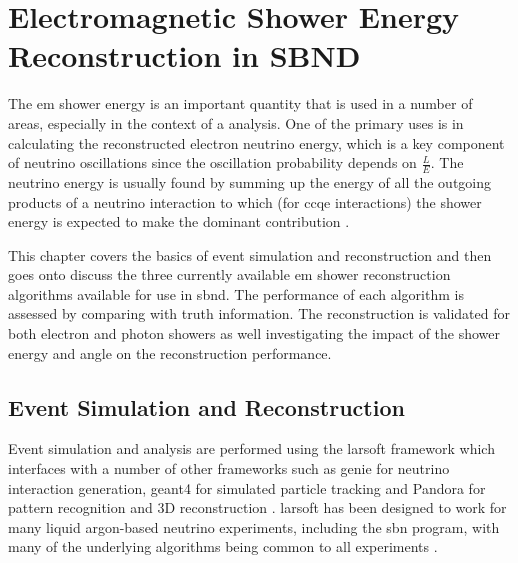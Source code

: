 \chapter{Electromagnetic Shower Energy Reconstruction in SBND}
\label{chap:Energy_Reco}

The \gls{em} shower energy is an important quantity that is used in a number of areas, especially in the context of a \nue analysis. One of the primary uses is in calculating the reconstructed electron neutrino energy, which is a key component of neutrino oscillations since the oscillation probability depends on $\frac{L}{E}$. The neutrino energy is usually found by summing up the energy of all the outgoing products of a neutrino interaction to which (for \nue \gls{ccqe} interactions) the shower energy is expected to make the dominant contribution \cite{neutrino_energy_reconstruction}. 

This chapter covers the basics of event simulation and reconstruction and then goes onto discuss the three currently available \gls{em} shower reconstruction algorithms available for use in \gls{sbnd}. The performance of each algorithm is assessed by comparing with truth information. The reconstruction is validated for both electron and photon showers as well investigating the impact of the shower energy and angle on the reconstruction performance. 

\section{Event Simulation and Reconstruction}\label{sec:Event Production and Reconstruction}

Event simulation and analysis are performed using the \gls{larsoft} framework which interfaces with a number of other frameworks such as \gls{genie} for neutrino interaction generation, \gls{geant4} for simulated particle tracking and Pandora for pattern recognition and 3D reconstruction \cite{GENIE}\cite{Geant4_website}\cite{Geant4_paper}\cite{Pandora_paper}. \gls{larsoft} has been designed to work for many liquid argon-based neutrino experiments, including the \gls{sbn} program, with many of the underlying algorithms being common to all experiments \cite{larsoft}\cite{larsoft_paper}.

